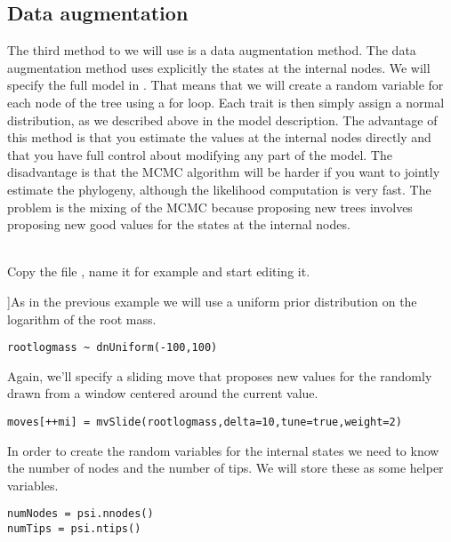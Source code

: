 \subsection{Data augmentation}

The third method to we will use is a data augmentation method. The data augmentation method uses explicitly the states at the internal nodes. We will specify the full model in \Rev.
That means that we will create a random variable for each node of the tree using a for loop. Each trait is then simply assign a normal distribution, as we described above in the model description.
The advantage of this method is that you estimate the values at the internal nodes directly and that you have full control about modifying any part of the model. The disadvantage is that the MCMC algorithm will be harder if you want to jointly estimate the phylogeny, although the likelihood computation is very fast. The problem is the mixing of the MCMC because proposing new trees involves proposing new good values for the states at the internal nodes.

\noindent \\ \impmark Copy the file , name it for example  and start editing it.

]As in the previous example we will use a uniform prior distribution on the logarithm of the root mass.
{\tt \small \begin{snugshade*}
\begin{lstlisting}
rootlogmass ~ dnUniform(-100,100)
\end{lstlisting}
\end{snugshade*}}
Again, we'll specify a sliding move that proposes new values for the  randomly drawn from a window centered around the current value.
{\tt \small \begin{snugshade*}
\begin{lstlisting}
moves[++mi] = mvSlide(rootlogmass,delta=10,tune=true,weight=2) 
\end{lstlisting}
\end{snugshade*}}

In order to create the random variables for the internal states we need to know the number of nodes and the number of tips.
We will store these as some helper variables.
{\tt \small \begin{snugshade*}
\begin{lstlisting}
numNodes = psi.nnodes()
numTips = psi.ntips()
\end{lstlisting}
\end{snugshade*}}

